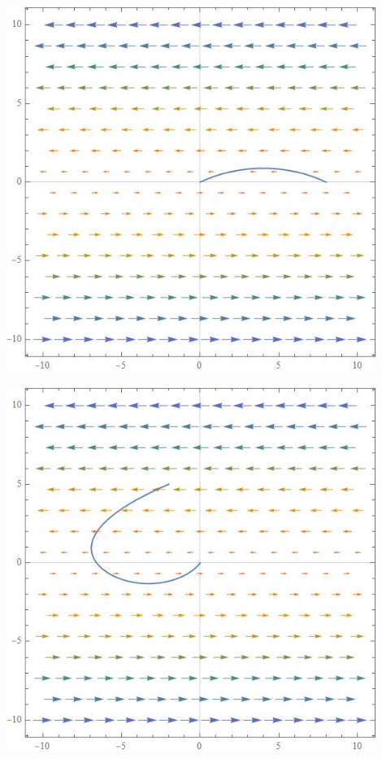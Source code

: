 \documentclass[reqno, a4paper]{amsart}
\begin{document}
\begin{minipage}{\textwidth}
	\begin{minipage}[b]{0.5\textwidth}
		\centering
		\includegraphics[width=0.9\textwidth]{lodka1}
	\end{minipage}
	\begin{minipage}[b]{0.5\textwidth}
		\centering
		\includegraphics[width=0.9\textwidth]{lodka2}
	\end{minipage}
	\hfill
\end{minipage}
\end{document}
